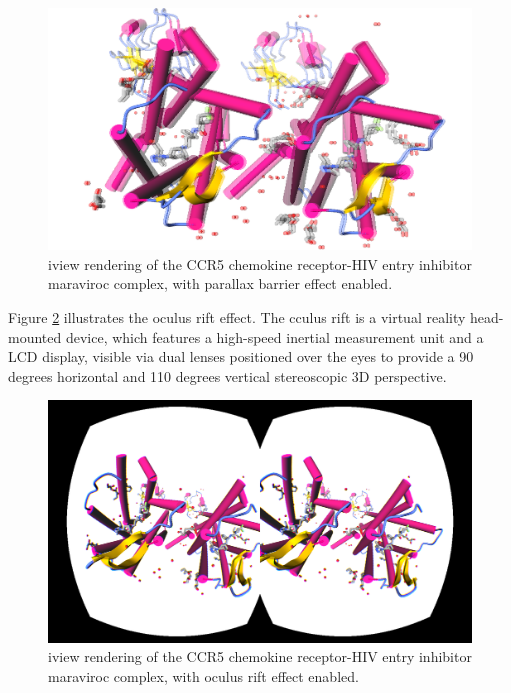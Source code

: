 \begin{figure}
\begin{center}
\includegraphics[width=\linewidth]{../iview/parallaxbarrier.png}
\end{center}
\caption{iview rendering of the CCR5 chemokine receptor-HIV entry inhibitor maraviroc complex, with parallax barrier effect enabled.}
\label{iview:parallaxbarrier}
\end{figure}

Figure \ref{iview:oculusrift} illustrates the oculus rift effect. The cculus rift is a virtual reality head-mounted device, which features a high-speed inertial measurement unit and a LCD display, visible via dual lenses positioned over the eyes to provide a 90 degrees horizontal and 110 degrees vertical stereoscopic 3D perspective.

\begin{figure}
\begin{center}
\includegraphics[width=\linewidth]{../iview/oculusrift.png}
\end{center}
\caption{iview rendering of the CCR5 chemokine receptor-HIV entry inhibitor maraviroc complex, with oculus rift effect enabled.}
\label{iview:oculusrift}
\end{figure}

